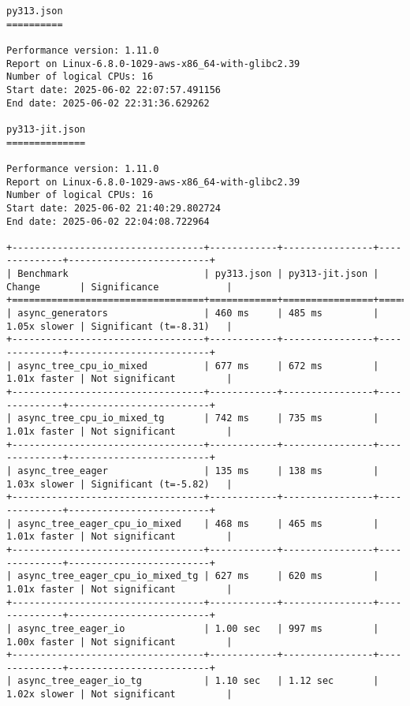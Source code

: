 \begin{code}
    \begin{verbatim}
py313.json
==========

Performance version: 1.11.0
Report on Linux-6.8.0-1029-aws-x86_64-with-glibc2.39
Number of logical CPUs: 16
Start date: 2025-06-02 22:07:57.491156
End date: 2025-06-02 22:31:36.629262

py313-jit.json
==============

Performance version: 1.11.0
Report on Linux-6.8.0-1029-aws-x86_64-with-glibc2.39
Number of logical CPUs: 16
Start date: 2025-06-02 21:40:29.802724
End date: 2025-06-02 22:04:08.722964

+----------------------------------+------------+----------------+--------------+-------------------------+
| Benchmark                        | py313.json | py313-jit.json | Change       | Significance            |
+==================================+============+================+==============+=========================+
| async_generators                 | 460 ms     | 485 ms         | 1.05x slower | Significant (t=-8.31)   |
+----------------------------------+------------+----------------+--------------+-------------------------+
| async_tree_cpu_io_mixed          | 677 ms     | 672 ms         | 1.01x faster | Not significant         |
+----------------------------------+------------+----------------+--------------+-------------------------+
| async_tree_cpu_io_mixed_tg       | 742 ms     | 735 ms         | 1.01x faster | Not significant         |
+----------------------------------+------------+----------------+--------------+-------------------------+
| async_tree_eager                 | 135 ms     | 138 ms         | 1.03x slower | Significant (t=-5.82)   |
+----------------------------------+------------+----------------+--------------+-------------------------+
| async_tree_eager_cpu_io_mixed    | 468 ms     | 465 ms         | 1.01x faster | Not significant         |
+----------------------------------+------------+----------------+--------------+-------------------------+
| async_tree_eager_cpu_io_mixed_tg | 627 ms     | 620 ms         | 1.01x faster | Not significant         |
+----------------------------------+------------+----------------+--------------+-------------------------+
| async_tree_eager_io              | 1.00 sec   | 997 ms         | 1.00x faster | Not significant         |
+----------------------------------+------------+----------------+--------------+-------------------------+
| async_tree_eager_io_tg           | 1.10 sec   | 1.12 sec       | 1.02x slower | Not significant         |

\end{verbatim}
\end{code}
